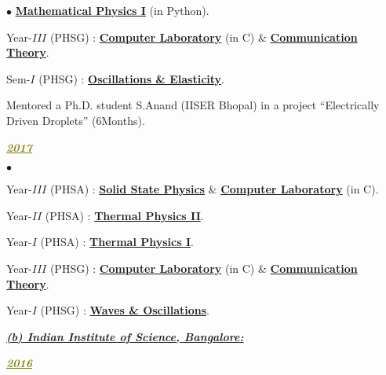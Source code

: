 \documentclass[margin,line]{res}
\newenvironment{list1}{
  \begin{list}{\ding{113}}{%
      \setlength{\itemsep}{0in}
      \setlength{\parsep}{0in} \setlength{\parskip}{0in}
      \setlength{\topsep}{0in} \setlength{\partopsep}{0in} 
      \setlength{\leftmargin}{0.17in}}}{\end{list}}
\newenvironment{list2}{
  \begin{list}{$\bullet$}{%
      \setlength{\itemsep}{0in}
      \setlength{\parsep}{0in} \setlength{\parskip}{0in}
      \setlength{\topsep}{0in} \setlength{\partopsep}{0in} 
      \setlength{\leftmargin}{0.2in}}}{\end{list}}
\begin{document}
\begin{resume}
\begin{list2}
                       \href{https://amitbny.github.io/akb.github.io/sem1H_numerlab.html}{\bf Mathematical Physics I} (in Python). 
\item Year-$III$ (PHSG) : \href{https://amitbny.github.io/akb.github.io/numerlabIVB.html}{\bf Computer Laboratory} (in C) \& 
                          \href{https://amitbny.github.io/akb.github.io/commun.html}{\bf Communication Theory}.
\item Sem-$I$ (PHSG) : \href{https://amitbny.github.io/akb.github.io/sem1G_osc.html}{\bf Oscillations \& Elasticity}. 
\item Mentored a Ph.D. student S.Anand (IISER Bhopal) in a project ``{\sf Electrically Driven Droplets}'' (6Months). 
\end{list2}
\begin{list1}
\item[] \textcolor{olive}{\underline{\textbf{\textit{2017}}}}
\vspace{1mm}
\end{list1}
\begin{list2}
\item Year-$III$ (PHSA) : \href{https://amitbny.github.io/akb.github.io/solidstateI.html}{\bf Solid State Physics} \&  
                          \href{https://amitbny.github.io/akb.github.io/numerlabVIIIB.html}{\bf Computer Laboratory} (in C). 
\item Year-$II$ (PHSA) : \href{https://amitbny.github.io/akb.github.io/thermphyII.html}{\bf Thermal Physics II}.
\item Year-$I$ (PHSA) : \href{https://amitbny.github.io/akb.github.io/thermphyI.html}{\bf Thermal Physics I}. 
\item Year-$III$ (PHSG) : \href{https://amitbny.github.io/akb.github.io/numerlabIVB.html}{\bf Computer Laboratory} (in C) \&  
                          \href{https://amitbny.github.io/akb.github.io/commun.html}{\bf Communication Theory}. 
\item Year-$I$ (PHSG) : \href{https://amitbny.github.io/akb.github.io/wavevibr.html}{\bf Waves \& Oscillations}.
\end{list2}
\begin{list1}
\vspace{1mm}
\item[] \textcolor{alizarin}{\underline{\textbf{\textit{(b) Indian Institute of Science, Bangalore:}}}}
\vspace{1mm}
\end{list1}
\begin{list1}
\item[] \textcolor{olive}{\underline{\textbf{\textit{2016}}}}

\end{list1}
\end{resume}
\end{document}
